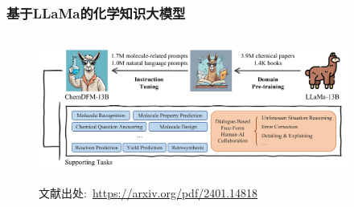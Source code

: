 \begin{frame}
	\frametitle{基于\textrm{LLaMa}的化学知识大模型}
\begin{figure}[h!]
\centering
\vskip -8pt
\includegraphics[height=1.9in,width=4.00in,viewport=0 0 915 405,clip]{Figures/ChemDFM.png}
\caption{\tiny\textrm{文献出处:~\url{https://arxiv.org/pdf/2401.14818}}}%
\label{Fig:ChemDFM}
\end{figure}
\end{frame}

